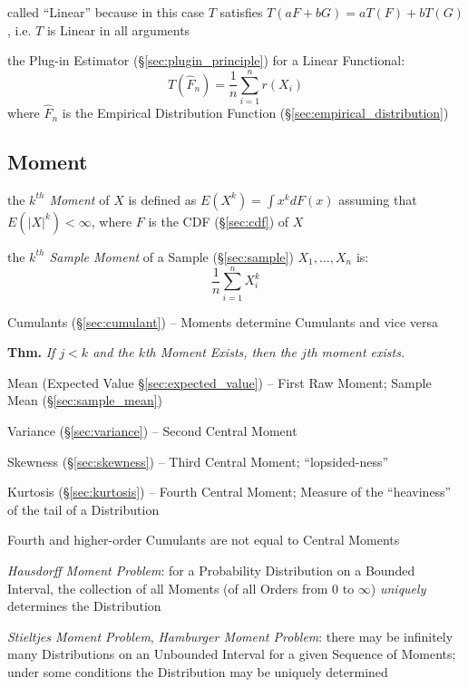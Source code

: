 called ``Linear'' because in this case $T$ satisfies
$T(aF + bG) = aT(F) + bT(G)$, i.e. $T$ is Linear in all arguments

the Plug-in Estimator (\S\ref{sec:plugin_principle}) for a Linear Functional:
\[
  T(\hat{F}_n) = \frac{1}{n}\sum_{i=1}^n r(X_i)
\]
where $\hat{F}_n$ is the Empirical Distribution Function
(\S\ref{sec:empirical_distribution})



\subsection{Moment}\label{sec:moment}

the \emph{$k^{th}$ Moment} of $X$ is defined as $E(X^k) = \int x^k dF(x)$
assuming that $E(|X|^k) < \infty$, where $F$ is the CDF (\S\ref{sec:cdf}) of $X$

the \emph{$k^{th}$ Sample Moment} of a Sample (\S\ref{sec:sample}) $X_1, \ldots,
X_n$ is:
\[
  \frac{1}{n}\sum_{i=1}^n X^k_{i}
\]

\fist Cumulants (\S\ref{sec:cumulant}) -- Moments determine Cumulants and vice
versa

\textbf{Thm.} \emph{If $j < k$ and the $k$th Moment Exists, then the $j$th
  moment exists.}

Mean (Expected Value \S\ref{sec:expected_value}) -- First Raw Moment; Sample
Mean (\S\ref{sec:sample_mean})

Variance (\S\ref{sec:variance}) -- Second Central Moment

Skewness (\S\ref{sec:skewness}) -- Third Central Moment; ``lopsided-ness''

Kurtosis (\S\ref{sec:kurtosis}) -- Fourth Central Moment; Measure of the
``heaviness'' of the tail of a Distribution

Fourth and higher-order Cumulants are not equal to Central Moments

\emph{Hausdorff Moment Problem}: for a Probability Distribution on a Bounded
Interval, the collection of all Moments (of all Orders from $0$ to $\infty$)
\emph{uniquely} determines the Distribution

\emph{Stieltjes Moment Problem}, \emph{Hamburger Moment Problem}: there may be
infinitely many Distributions on an Unbounded Interval for a given Sequence of
Moments; under some conditions the Distribution may be uniquely determined

